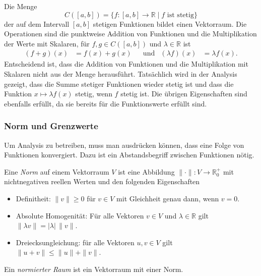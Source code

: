 \begin{beispiel}
Die Menge
\[
C([a,b])
=
\{f\colon[a,b]\to\mathbb{R}\mid \text{$f$ ist stetig}\}
\]
der auf dem Intervall $[a,b]$ stetigen Funktionen bildet einen Vektorraum.
Die Operationen sind die punktweise Addition von Funktionen und die
Multiplikation der Werte mit Skalaren, für $f,g\in C([a,b])$ und
$\lambda\in \mathbb{R}$ ist
\begin{align*}
(f+g)(x) &= f(x)+g(x)
&&\text{und}&
(\lambda f)(x) &= \lambda f(x).
\end{align*}
Entscheidend ist, dass die Addition von Funktionen und die Multiplikation
mit Skalaren nicht aus der Menge herausführt.
Tatsächlich wird in der Analysis gezeigt, dass die Summe stetiger Funktionen
wieder stetig ist und dass die Funktion $x\mapsto \lambda f(x)$ stetig,
wenn $f$ stetig ist.
Die übrigen Eigenschaften sind ebenfalls erfüllt, da sie bereits für die
Funktionswerte erfüllt sind.
\end{beispiel}

%
%
\subsubsection{Norm und Grenzwerte}
Um Analysis zu betreiben, muss man ausdrücken können, dass eine Folge
von Funktionen konvergiert.
Dazu ist ein Abstandsbegriff zwischen Funktionen nötig.

\begin{definition}
Eine {\em Norm} auf einem Vektorraum $V$ ist eine Abbildung
%
$\|\cdot\|\colon V\to\mathbb{R}^+_0$ mit nichtnegativen reellen Werten
und den folgenden Eigenschaften
\begin{itemize}
\item Definitheit: $\|v\|\ge 0$ für $v\in V$ mit Gleichheit 
genau dann, wenn $v=0$.
%
\item Absolute Homogenität: Für alle Vektoren $v\in V$ und
%
$\lambda\in\mathbb{R}$ gilt $\|\lambda v\| = |\lambda|\, \|v\|$.
\item Dreiecksungleichung: für alle Vektoren $u,v\in V$ gilt
%
$\|u+v\|\le \|u\|+\|v\|$.
\end{itemize}
Ein {\em normierter Raum} ist ein Vektorraum mit einer Norm.
%
\end{definition}

